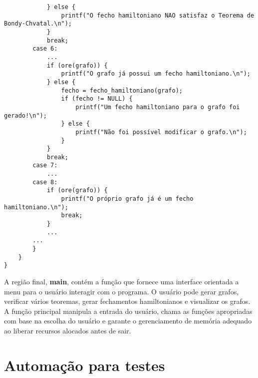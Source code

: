 \documentclass[12pt, openright, oneside, a4paper, chapter=TITLE, section=TITLE, subsection=TITLE, subsubsection=TITLE, brazil]{abntex2}
\newenvironment{codebox}%
  {\begin{mdframed}[backgroundcolor=gray!5, linecolor=gray, roundcorner=5pt]}%
  {\end{mdframed}}
\begin{document}
\begin{codebox}
\begin{verbatim}
            } else {
                printf("O fecho hamiltoniano NAO satisfaz o Teorema de Bondy-Chvatal.\n");
            }
            break;
        case 6:
            ...
            if (ore(grafo)) {
                printf("O grafo já possui um fecho hamiltoniano.\n");
            } else {
                fecho = fecho_hamiltoniano(grafo);
                if (fecho != NULL) {
                    printf("Um fecho hamiltoniano para o grafo foi gerado!\n");
                } else {
                    printf("Não foi possível modificar o grafo.\n");
                }
            }
            break;
        case 7:
            ...
        case 8:
            if (ore(grafo)) {
                printf("O próprio grafo já é um fecho hamiltoniano.\n");
                break;
            }
            ...
        ...
        }
    }
}
\end{verbatim}
\end{codebox}
A região final, \textbf{main}, contém a função  que fornece uma interface orientada a menu para o usuário interagir com o programa. O usuário pode gerar grafos, verificar vários teoremas, gerar fechamentos hamiltonianos e visualizar os grafos. A função principal manipula a entrada do usuário, chama as funções apropriadas com base na escolha do usuário e garante o gerenciamento de memória adequado ao liberar recursos alocados antes de sair.

\section{Automação para testes}

\printindex
\end{document}
